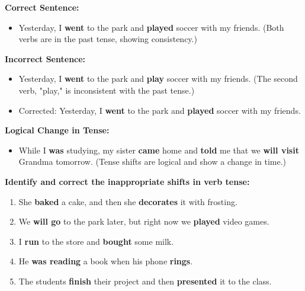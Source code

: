 \documentclass[12pt]{article}
\begin{document}
\begin{tcolorbox}[colframe=black!60, colback=white, 
coltitle=black, colbacktitle=black!15, fonttitle=\bfseries\Large, 
title=Examples, halign title=center, left=10pt, right=10pt, top=10pt, bottom=15pt]

\textbf{Correct Sentence:}
\begin{itemize}
    \item Yesterday, I \textbf{went} to the park and \textbf{played} soccer with my friends. (Both verbs are in the past tense, showing consistency.)
\end{itemize}

\textbf{Incorrect Sentence:}
\begin{itemize}
    \item Yesterday, I \textbf{went} to the park and \textbf{play} soccer with my friends. (The second verb, "play," is inconsistent with the past tense.)
    \item Corrected: Yesterday, I \textbf{went} to the park and \textbf{played} soccer with my friends.
\end{itemize}

\textbf{Logical Change in Tense:}
\begin{itemize}
    \item While I \textbf{was} studying, my sister \textbf{came} home and \textbf{told} me that we \textbf{will visit} Grandma tomorrow. (Tense shifts are logical and show a change in time.)
\end{itemize}

\end{tcolorbox}

\vspace{1em}

\begin{tcolorbox}[colframe=black!60, colback=white, 
coltitle=black, colbacktitle=black!15, fonttitle=\bfseries\Large, 
title=Guided Practice, halign title=center, left=10pt, right=10pt, top=10pt, bottom=15pt]
\textbf{Identify and correct the inappropriate shifts in verb tense:}
\begin{enumerate}[itemsep=3em]
    \item She \textbf{baked} a cake, and then she \textbf{decorates} it with frosting.
    \item We \textbf{will go} to the park later, but right now we \textbf{played} video games.
    \item I \textbf{run} to the store and \textbf{bought} some milk.
    \item He \textbf{was reading} a book when his phone \textbf{rings}.
    \item The students \textbf{finish} their project and then \textbf{presented} it to the class.
\end{enumerate}
\end{tcolorbox}
\end{document}
